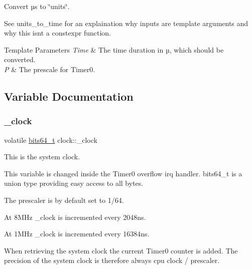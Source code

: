 Convert µs to \char`\"{}units\char`\"{}. 

See units\+\_\+to\+\_\+time for an explaination why inputs are template arguments and why this isn\textquotesingle{}t a constexpr function.


\begin{DoxyTemplParams}{Template Parameters}
{\em Time} & The time duration in µ, which should be converted. \\
\hline
{\em P} & The prescale for {\ttfamily Timer0}. \\
\hline
\end{DoxyTemplParams}


\subsection{Variable Documentation}
\hypertarget{namespaceclock_a0cfce972d3684eddb3dd61bb0baaf225}{}\label{namespaceclock_a0cfce972d3684eddb3dd61bb0baaf225} 
\subsubsection{\texorpdfstring{\+\_\+clock}{\_clock}}
{\footnotesize\ttfamily volatile \hyperlink{unionbits64__s}{bits64\+\_\+t} clock\+::\+\_\+clock}



This is the system clock. 

This variable is changed inside the {\ttfamily Timer0} overflow irq handler. {\ttfamily bits64\+\_\+t} is a union type providing easy access to all bytes.

The prescaler is by default set to 1/64.
\begin{DoxyItemize}
\item At 8\+M\+Hz \+\_\+clock is incremented every 2\textquotesingle{}048ns.
\item At 1\+M\+Hz \+\_\+clock is incremented every 16\textquotesingle{}384ns.
\end{DoxyItemize}

When retrieving the system clock the current {\ttfamily Timer0} counter is added. The precision of the system clock is therefore always cpu clock / prescaler. 